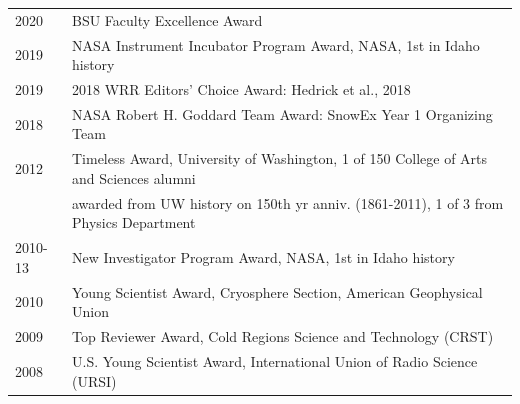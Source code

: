 \documentclass[11pt]{article}
\begin{document}
\begin{tabular}{ll}
2020 & BSU Faculty Excellence Award \\
2019 & NASA Instrument Incubator Program Award, NASA, 1st in Idaho history \\
2019 & 2018 WRR Editors' Choice Award: Hedrick et al., 2018 \\
2018 & NASA Robert H. Goddard Team Award: SnowEx Year 1 Organizing Team \\
2012 & Timeless Award, University of Washington, 1 of 150 College of Arts and Sciences alumni  \\
& awarded from UW history on 150th yr anniv. (1861-2011), 1 of 3 from Physics Department \\
2010-13 & New Investigator Program Award, NASA, 1st in Idaho history \\
2010 & Young Scientist Award, Cryosphere Section, American Geophysical Union \\
2009 & Top Reviewer Award, Cold Regions Science and Technology (CRST) \\
2008 & U.S. Young Scientist Award, International Union of Radio Science (URSI) \\
\end{tabular}
\end{document}
